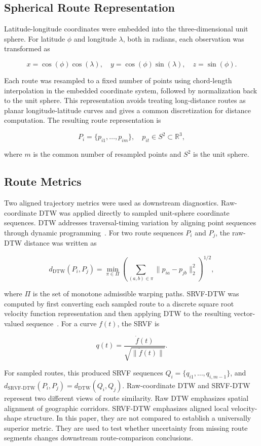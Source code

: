 \documentclass[pdflatex,sn-vancouver-num]{sn-jnl}
\begin{document}
\subsection{Spherical Route Representation}\label{spherical-route-representation}

Latitude-longitude coordinates were embedded into the three-dimensional unit sphere. For latitude $\phi$ and longitude $\lambda$, both in radians, each observation was transformed as

\[
x = \cos(\phi)\cos(\lambda), \quad
y = \cos(\phi)\sin(\lambda), \quad
z = \sin(\phi).
\]

Each route was resampled to a fixed number of points using chord-length interpolation in the embedded coordinate system, followed by normalization back to the unit sphere. This representation avoids treating long-distance routes as planar longitude-latitude curves and gives a common discretization for distance computation. The resulting route representation is

\[
P_i = \{p_{i1}, \ldots, p_{im}\}, \quad p_{it} \in S^2 \subset \mathbb{R}^3,
\]

where $m$ is the common number of resampled points and $S^2$ is the unit sphere.

\subsection{Route Metrics}\label{route-metrics}

Two aligned trajectory metrics were used as downstream diagnostics. Raw-coordinate DTW was applied directly to sampled unit-sphere coordinate sequences. DTW addresses traversal-timing variation by aligning point sequences through dynamic programming~\cite{sakoe1978}. For two route sequences $P_i$ and $P_j$, the raw-DTW distance was written as

\[
d_{\mathrm{DTW}}(P_i,P_j)
= \min_{\pi \in \Pi}
\left(\sum_{(a,b)\in \pi} \lVert p_{ia}-p_{jb}\rVert_2^2\right)^{1/2},
\]

where $\Pi$ is the set of monotone admissible warping paths. SRVF-DTW was computed by first converting each sampled route to a discrete square root velocity function representation and then applying DTW to the resulting vector-valued sequence~\cite{srivastava2011}. For a curve $f(t)$, the SRVF is

\[
q(t) = \frac{\dot f(t)}{\sqrt{\|\dot f(t)\|}}.
\]

For sampled routes, this produced SRVF sequences $Q_i=\{q_{i1},\ldots,q_{i,m-1}\}$, and $d_{\mathrm{SRVF\text{-}DTW}}(P_i,P_j)=d_{\mathrm{DTW}}(Q_i,Q_j)$. Raw-coordinate DTW and SRVF-DTW represent two different views of route similarity. Raw DTW emphasizes spatial alignment of geographic corridors. SRVF-DTW emphasizes aligned local velocity-shape structure. In this paper, they are not compared to establish a universally superior metric. They are used to test whether uncertainty from missing route segments changes downstream route-comparison conclusions.
\end{document}
